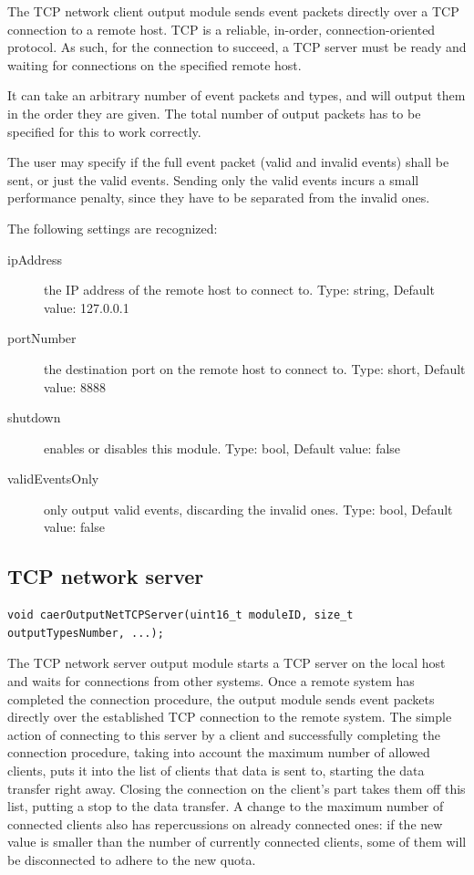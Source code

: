 \documentclass[a4paper,12pt]{report}
\begin{document}
The TCP network client output module sends event packets directly over a TCP connection to a remote host.
TCP is a reliable, in-order, connection-oriented protocol. As such, for the connection to succeed, a TCP server must be ready and waiting for connections on the specified remote host.

It can take an arbitrary number of event packets and types, and will output them in the order they are given. The total number of output packets has to be specified for this to work correctly.

The user may specify if the full event packet (valid and invalid events) shall be sent, or just the valid events. Sending only the valid events incurs a small performance penalty, since they have to be separated from the invalid ones.

The following settings are recognized:
\begin{description}
\item[ipAddress] the IP address of the remote host to connect to.
\subitem Type: string, Default value: 127.0.0.1
\item[portNumber] the destination port on the remote host to connect to.
\subitem Type: short, Default value: 8888
\item[shutdown] enables or disables this module.
\subitem Type: bool, Default value: false
\item[validEventsOnly] only output valid events, discarding the invalid ones.
\subitem Type: bool, Default value: false
\end{description}

\subsection{TCP network server} \label{subsec:tcp_network_server}

\begin{lstlisting}
void caerOutputNetTCPServer(uint16_t moduleID, size_t outputTypesNumber, ...);
\end{lstlisting}

The TCP network server output module starts a TCP server on the local host and waits for connections from other systems. Once a remote system has completed the connection procedure, the output module sends event packets directly over the established TCP connection to the remote system.
The simple action of connecting to this server by a client and successfully completing the connection procedure, taking into account the maximum number of allowed clients, puts it into the list of clients that data is sent to, starting the data transfer right away.
Closing the connection on the client's part takes them off this list, putting a stop to the data transfer.
A change to the maximum number of connected clients also has repercussions on already connected ones: if the new value is smaller than the number of currently connected clients, some of them will be disconnected to adhere to the new quota.
\end{document}
